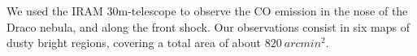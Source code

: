 \documentclass[traditabstract]{aa}
\begin{document}
   We used the IRAM 30m-telescope to observe the CO emission in the nose of the Draco nebula, and along the front shock. Our observations consist in six maps of dusty bright regions, covering a total area of about $820\: arcmin^2$.

%
%
\end{document}
